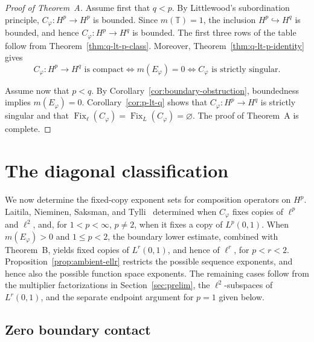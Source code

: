 \documentclass[11pt, reqno]{amsart}
\theoremstyle{definition}
\theoremstyle{remark}
\newcommand{\T}{\mathbb{T}}
\begin{document}
\begin{proof}[Proof of Theorem~A]
Assume first that \(q<p\). By Littlewood's subordination principle,
\(C_\varphi:H^p\to H^p\) is bounded. Since \(m(\T)=1\), the inclusion
\(H^p\hookrightarrow H^q\) is bounded, and hence
\(C_\varphi:H^p\to H^q\) is bounded. The first three rows of the table
follow from
Theorem~\ref{thm:q-lt-p-class}.
Moreover, Theorem~\ref{thm:q-lt-p-identity} gives
\[
C_\varphi:H^p\to H^q\text{ is compact}
\Longleftrightarrow
m(E_\varphi)=0
\Longleftrightarrow
C_\varphi\text{ is strictly singular}.
\]

Assume now that \(p<q\). By
Corollary~\ref{cor:boundary-obstruction}, boundedness implies
\(m(E_\varphi)=0\). Corollary~\ref{cor:p-lt-q}
shows that \(C_\varphi:H^p\to H^q\) is strictly singular and that
\(\operatorname{Fix}_{\ell}(C_\varphi)
=\operatorname{Fix}_{L}(C_\varphi)=\varnothing\).
The proof of Theorem~A is complete. 
\end{proof}
\smallskip   







\section{The diagonal classification}
\label{sec:diag}

We now determine the fixed-copy exponent sets for composition operators
on \(H^p\). Laitila, Nieminen, Saksman, and Tylli~\cite{LNST2017}
determined when \(C_\varphi\) fixes copies of \(\ell^p\) and
\(\ell^2\), and, for \(1<p<\infty\), \(p\ne2\), when it fixes a copy
of \(L^p(0,1)\). When \(m(E_\varphi)>0\) and \(1\le p<2\), the
boundary lower estimate, combined with Theorem~B, yields fixed copies
of \(L^r(0,1)\), and hence of \(\ell^r\), for \(p<r<2\).
Proposition~\ref{prop:ambient-ellr} restricts the possible sequence
exponents, and hence also the possible function space exponents. The
remaining cases follow from the multiplier factorizations in
Section~\ref{sec:prelim}, the \(\ell^2\)-subspaces of
\(L^r(0,1)\), and the separate endpoint argument for \(p=1\) given
below.



\subsection{Zero boundary contact}
\end{document}
